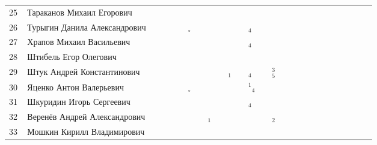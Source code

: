 \documentclass[a4paper,11pt]{article}
\newcommand*\Ok{&\small \ding{51}$\!\!_\circ$} %
\newcommand*\ok{&{\small \ding{51}}} %
\newcommand*\no{&{\small }} %
\newcommand*\da{&{\small\ding{48}$\!\!_1$}} %
\newcommand*\ad{&{\small${}^1\!\!$\ding{48}$\!\!_4$}} %
\newcommand*\db{&{\small\ding{48}$\!\!_2$}} %
\newcommand*\dd{&{\small\ding{48}$\!\!_4$}} %
\newcommand*\ce{&{\small\ding{48}$\!\!^3_5$}} %
\begin{document}
\begin{tabular}{p{7pt}|l|p{6pt}p{6pt}p{6pt}p{6pt}p{6pt}p{6pt}p{6pt}p{6pt}p{6pt}p{6pt}p{6pt}p{6pt}p{6pt}p{6pt}p{6pt}p{6pt}p{6pt}p{6pt}p{6pt}p{6pt}p{6pt}p{6pt}p{6pt}p{6pt}}
25\,&Тараканов Михаил Егорович		\ok\ok\ok\ok\ok\ok\no\ok\ok\ok\ok\no\no\\
26\,&Турыгин Данила Александрович	\ok\ok\ok\ok\Ok\ok\ok\ok\ok\ok\dd\ok\ok\\
27\,&Храпов Михаил Васильевич		\ok\ok\ok\ok\no\no\ok\ok\ok\ok\dd\ok\ok\\
\midrule
28\,&Штибель Егор Олегович		\no\no\ok\\
29\,&Штук Андрей Константинович		\ok\ok\ok\ok\ok\ok\no\ok\da\ok\dd\ok\ce\\
30\,&Яценко Антон Валерьевич		\ok\ok\ok\ok\Ok\no\ok\no\ok\ok\ad\no\no\\
31\,&Шкуридин Игорь Сергеевич		\ok\no\ok\ok\ok\ok\ok\ok\no\ok\dd\no\no\\
32\,&Веренёв Андрей Александрович	\ok\ok\ok\ok\ok\ok\da\no\ok\ok\ok\ok\db\\
33\,&Мошкин Кирилл Владимирович		\ok\ok\ok\ok\ok\ok\no\ok\ok\ok\no\no\no\\
\bottomrule
\end{tabular} 
\end{document}
